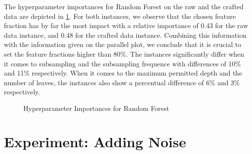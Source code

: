 The hyperparameter importances for Random Forest on the raw and the crafted data are depicted in \ref{fig:RF_Importances}. For both instances, we observe that the chosen feature fraction has by far the most impact with a relative importance of 0.43 for the raw data instance, and 0.48 for the crafted data instance. Combining this information with the information given on the parallel plot, we conclude that it is crucial to set the feature fractions higher than 80\%. The instances significantly differ when it comes to subsampling and the subsampling frequence with differences of 10\% and 11\% respectively. When it comes to the maximum permitted depth and the number of leaves, the instances also show a percentual difference of 6\% and 3\% respectively.
\begin{figure}[h]
	\centering
	\caption{Hyperparameter Importances for Random Forest}
	\label{fig:RF_Importances}
\end{figure} 
 
\section{Experiment: Adding Noise}\label{sec:noise}





